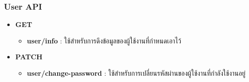 \subsubsection{User API}

\ifenglish
\else
\begin{itemize}
    \item \textbf{GET}
    \begin{itemize}
        \item \textbf{user/info} : ใช้สำหรับการดึงข้อมูลของผู้ใช้งานที่กำหนดเอาไว้
    \end{itemize}
    \item \textbf{PATCH}
    \begin{itemize}
        \item \textbf{user/change-password} : ใช้สำหรับการเปลี่ยนรหัสผ่านของผู้ใช้งานที่กำลังใช้งานอยู่
    \end{itemize}
\end{itemize}
\fi